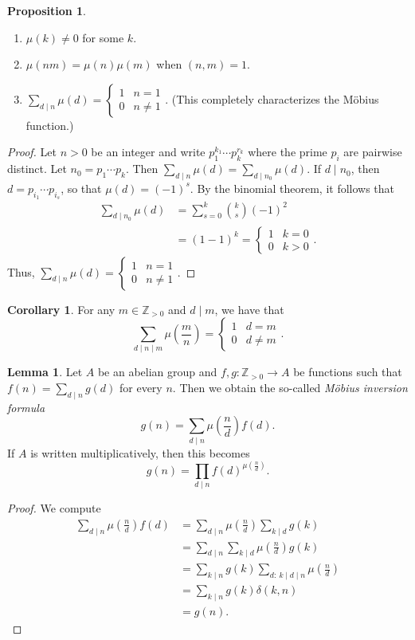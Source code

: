 \documentclass[10pt,letterpaper,cm]{nupset}
\theoremstyle{definition}
\theoremstyle{theorem}
\newtheorem{lemma}[definition]{Lemma}
\newtheorem{prop}[definition]{Proposition}
\newtheorem{corollary}[definition]{Corollary}
\theoremstyle{remark}
\newcommand{\Z}{\mathbb Z}
\newcommand{\1}{\mathbf{1}}
\newcommand{\0}{\vec 0}
\begin{document}
\begin{prop} $ $
\begin{enumerate}
\item $\mu(k) \ne 0$ for some $k$.
\item $\mu(nm) = \mu(n) \mu(m)$ when $(n,m) = 1$.
\item $\sum_{d\mid n}\mu(d) = \begin{cases} 1 & n=1 \\ 0 & n \ne 1 \end{cases}.$ (This completely characterizes the M\"{o}bius function.)
\end{enumerate}
\end{prop}
\begin{proof} Let $n>0$ be an integer and write $p_1^{k_1}\cdots p_k^{r_k}$ where the prime $p_i$ are pairwise distinct. Let $n_0 = p_1\cdots p_k$. Then $\sum_{d\mid n}\mu(d) =\sum_{d\mid n_0} \mu(d)$. If $d\mid n_0$, then $d= p_{i_1}\cdots p_{i_s}$, so that $\mu(d) = ({-}1)^s$. By the binomial theorem, it follows that \begin{align*} \sum_{d\mid n_0}\mu(d) & = \sum_{s=0}^k {k\choose s}({-}1)^2\\ & = (1-1)^k=\begin{cases} 1 & k=0 \\ 0 & k>0 \end{cases}  . \end{align*}
Thus, $\sum_{d\mid n}\mu(d) = \begin{cases} 1 & n=1 \\ 0 & n \ne 1 \end{cases}.$
\end{proof}


\begin{corollary}
For any $m\in \Z_{>0}$ and $d\mid m$, we have that $$\sum_{d\mid n \mid m}\mu \left(\frac{m}{n} \right) = \begin{cases}  1 & d = m \\ 0 & d\ne m\end{cases}.$$
\end{corollary}

\begin{lemma}
Let $A$ be an abelian group and $f,g: \Z_{>0}\to A$ be functions such that $f(n) = \sum_{d\mid n}g(d)$ for every $n$. Then we obtain the so-called \textit{M\"{o}bius inversion formula} $$g(n) = \sum_{d\mid n}\mu \left(\frac{n}{d} \right)f(d).$$ If $A$ is written multiplicatively, then this becomes  $$g(n) = \prod_{d\mid n}f(d)^{\mu \left(\frac{n}{d} \right)}.$$
\end{lemma}
\begin{proof}
We compute
\begin{align*}
 \sum_{d\mid n}\mu \left(\frac{n}{d} \right)f(d) & = \sum_{d\mid n}\mu \left(\frac{n}{d} \right)\sum_{k\mid d}g(k)
 \\ & = \sum_{d\mid n}\sum_{k\mid d}\mu \left(\frac{n}{d} \right) g(k)
 \\ & = \sum_{k\mid n}g(k) \sum_{d:\ k\mid d \mid n}\mu \left(\frac{n}{d} \right)
 \\ & = \sum_{k\mid n}g(k) \delta(k,n)
 \\ & = g(n).
\end{align*}
\end{proof}
\end{document}
